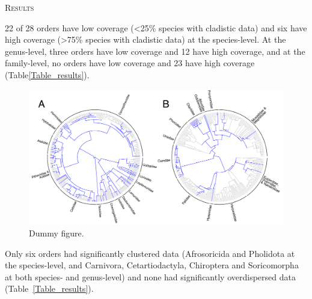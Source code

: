 \documentclass[12pt,letterpaper]{article}
\renewcommand{\section}[1]{%
\bigskip
\begin{center}
\begin{Large}
\normalfont\scshape #1
\medskip
\end{Large}
\end{center}}
\begin{document}
%
%


\section{Results}
22 of 28 orders have low coverage (\textless 25\% species with cladistic data) and six have high coverage (\textgreater 75\% species with cladistic data) at the species-level.
At the genus-level, three orders have low coverage and 12 have high coverage, and at the family-level, no orders have low coverage and 23 have high coverage (Table\ref{Table_results}).



\begin{figure}[!htbp]
\centering
    \includegraphics[width=1\textwidth]{example_coverage.pdf}
\caption{Dummy figure.}
\label{Figure_example_coverage}
\end{figure}




Only six orders had significantly clustered data (Afrosoricida and Pholidota at the species-level, and Carnivora, Cetartiodactyla, Chiroptera and Soricomorpha at both species- and genus-level) and none had significantly overdispersed data (Table~\ref{Table_results}).
\end{document}
